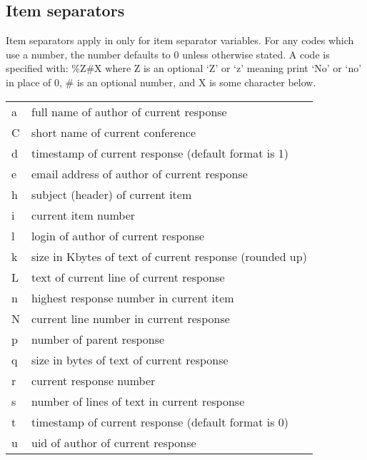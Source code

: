 \documentclass[twoside]{report}
\begin{document}
      \subsection{Item separators }

         Item separators apply in only for item separator
         variables.  For any codes which use a number, the number defaults to 0
         unless otherwise stated.  A code is specified with: \%Z\#X 
         where Z is an optional `Z' or `z' meaning print `No' or 
         `no' in place of 0, \# is an optional number, and X is some 
         character below.
   

         \tablelasttail{\hline}
         \begin{supertabular}{ll}
            a     & full name of author of current response \\
            C     & short name of current conference \\
            d     & timestamp of current response (default format is 1) \\
            e     & email address of author of current response \\
            h     & subject (header) of current item \\
            i     & current item number \\
            l     & login of author of current response \\
            k     & size in Kbytes of text of current response (rounded up) \\
            L     & text of current line of current response \\
            n     & highest response number in current item \\
            N     & current line number in current response \\
            p     & number of parent response \\
            q     & size in bytes of text of current response \\
            r     & current response number \\
            s     & number of lines of text in current response \\
            t     & timestamp of current response (default format is 0) \\
            u     & uid of author of current response \\
         
         \end{supertabular}
\vspace{12pt}
\end{document}

